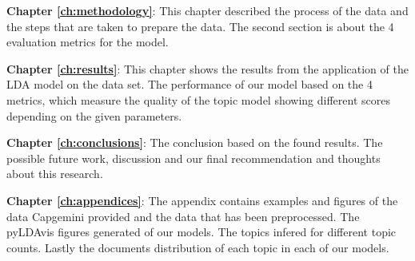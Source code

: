 \textbf{Chapter \ref{ch:methodology}}: This chapter described the process of the data and the steps that are taken to prepare the data. The second section is about the 4 evaluation metrics for the model.

\textbf{Chapter \ref{ch:results}}: This chapter shows the results from the application of the LDA model on the data set. The performance of our model based on the 4 metrics, which measure the quality of the topic model showing different scores depending on the given parameters.

\textbf{Chapter \ref{ch:conclusions}}: The conclusion based on the found results. The possible future work, discussion and our final recommendation and thoughts about this research.

\textbf{Chapter \ref{ch:appendices}}: The appendix contains examples and figures of the data Capgemini provided and the data that has been preprocessed. The pyLDAvis figures generated of our models. The topics infered for different topic counts. Lastly the documents distribution of each topic in each of our models.

\begin{comment}
It is recommended to end the introduction with an overview of the thesis. This chapter contains the introduction; Chapter~\ref{ch:definitions} includes the definitions; Chapter~\ref{ch:relatedwork} discusses related work; Chapter~\ref{ch:evaluation} evaluates the contributions; Chapter~\ref{ch:conclusions} concludes.

Also make a nice sentence with ``bachelor thesis'', LIACS and the names of the supervisors.

\end{comment}